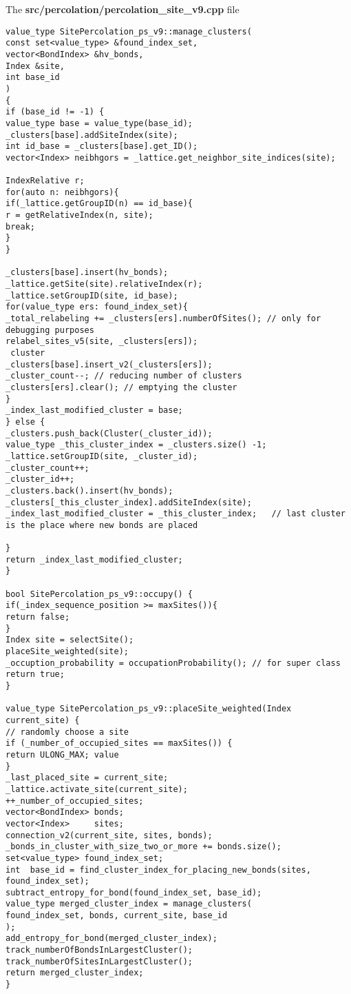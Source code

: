 
The \textbf{src/percolation/percolation\_site\_v9.cpp} file

\begin{lstlisting}[style=CStyle]
value_type SitePercolation_ps_v9::manage_clusters(
const set<value_type> &found_index_set,
vector<BondIndex> &hv_bonds,
Index &site,
int base_id
)
{
if (base_id != -1) {
value_type base = value_type(base_id);
_clusters[base].addSiteIndex(site);
int id_base = _clusters[base].get_ID();
vector<Index> neibhgors = _lattice.get_neighbor_site_indices(site);

IndexRelative r;
for(auto n: neibhgors){
if(_lattice.getGroupID(n) == id_base){
r = getRelativeIndex(n, site);
break; 
}
}

_clusters[base].insert(hv_bonds);
_lattice.getSite(site).relativeIndex(r);
_lattice.setGroupID(site, id_base); 
for(value_type ers: found_index_set){
_total_relabeling += _clusters[ers].numberOfSites(); // only for debugging purposes
relabel_sites_v5(site, _clusters[ers]);
 cluster
_clusters[base].insert_v2(_clusters[ers]);
_cluster_count--; // reducing number of clusters
_clusters[ers].clear(); // emptying the cluster
}
_index_last_modified_cluster = base;
} else {
_clusters.push_back(Cluster(_cluster_id));
value_type _this_cluster_index = _clusters.size() -1;
_lattice.setGroupID(site, _cluster_id); 
_cluster_count++; 
_cluster_id++;
_clusters.back().insert(hv_bonds);
_clusters[_this_cluster_index].addSiteIndex(site);
_index_last_modified_cluster = _this_cluster_index;   // last cluster is the place where new bonds are placed

}
return _index_last_modified_cluster;
}

bool SitePercolation_ps_v9::occupy() {
if(_index_sequence_position >= maxSites()){
return false;
}
Index site = selectSite();
placeSite_weighted(site);
_occuption_probability = occupationProbability(); // for super class
return true;
}

value_type SitePercolation_ps_v9::placeSite_weighted(Index current_site) {
// randomly choose a site
if (_number_of_occupied_sites == maxSites()) {
return ULONG_MAX; value
}
_last_placed_site = current_site;
_lattice.activate_site(current_site);
++_number_of_occupied_sites;
vector<BondIndex> bonds;
vector<Index>     sites;
connection_v2(current_site, sites, bonds);
_bonds_in_cluster_with_size_two_or_more += bonds.size();
set<value_type> found_index_set;
int  base_id = find_cluster_index_for_placing_new_bonds(sites, found_index_set);
subtract_entropy_for_bond(found_index_set, base_id); 
value_type merged_cluster_index = manage_clusters(
found_index_set, bonds, current_site, base_id
);
add_entropy_for_bond(merged_cluster_index);
track_numberOfBondsInLargestCluster();
track_numberOfSitesInLargestCluster();
return merged_cluster_index;
}


\end{lstlisting}
